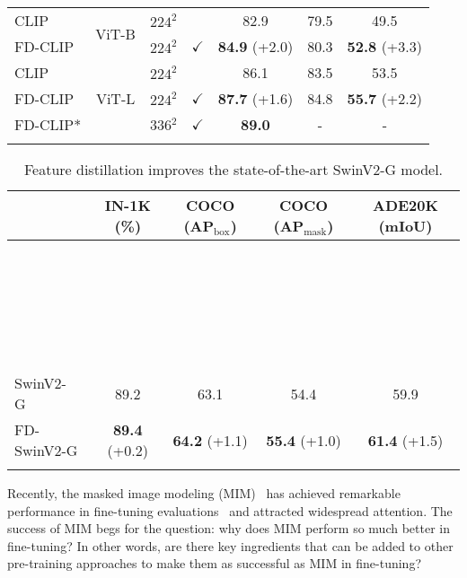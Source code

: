 \documentclass{article}
\begin{document}
\begin{table}[t]
\begin{tabular}{l|c|c|c|cc|c}
  \hline
    \hline
  CLIP~\cite{radford2021clip} & \multirow{2}{*}{ViT-B} & \multirow{1}{*}{$224^2$} &  & 82.9 & 79.5 & 49.5 \\
  FD-CLIP & & \multirow{1}{*}{$224^2$} & $\checkmark$ & \textbf{84.9}\scriptsize{ (+2.0)} & 80.3 & \textbf{52.8}\scriptsize{ (+3.3)} \\
  \hline
  CLIP~\cite{radford2021clip} & \multirow{3}{*}{ViT-L} & \multirow{1}{*}{$224^2$} & & 86.1 & 83.5 & 53.5\\
  FD-CLIP &  & $224^2$ & $\checkmark$ & \textbf{87.7}\scriptsize{ (+1.6)} & 84.8 & \textbf{55.7}\scriptsize{ (+2.2)}\\
  FD-CLIP* & & 336$^2$ & $\checkmark$ & \textbf{89.0}\scriptsize{} &  - & - \\
\Xhline{1.0pt}
  \end{tabular}
\label{tab:teaser_FD}
\end{table}


\begin{table}[t]
\caption{Feature distillation improves the state-of-the-art SwinV2-G model.}
\centering
  \begin{tabular}{l|c|c|c|c}
\Xhline{1.0pt}
  \multirow{1}{*}{Method} &  \multirow{1}{*}{IN-1K (\%)} & \multirow{1}{*}{COCO (AP$_\text{box}$)} & \multirow{1}{*}{COCO (AP$_\text{mask}$)} & \multirow{1}{*}{ADE20K (mIoU)} \\
  \hline
  \color{gray}{GLIPv2-CoSwin-H}~\cite{GLIPv2_2022} & \color{gray}{-} & \color{gray}{62.4} & \color{gray}{-} & \color{gray}{-} \\
  \color{gray}{Florence-CoSwin-H}~\cite{yuan2021florence} & \color{gray}{-} & \color{gray}{62.4} & \color{gray}{-} & \color{gray}{-}  \\
  \color{gray}{DINO-Swin-L}~\cite{zhang2022dino} & \color{gray}{-} & \color{gray}{63.3} & \color{gray}{-} & \color{gray}{-} \\
  \color{gray}{MaskDINO-Swin-L}~\cite{li2022mask} & \color{gray}{-} & \color{gray}{-} & \color{gray}{54.7} & \color{gray}{60.8} \\
  \color{gray}{ViT-Adapter-L}~\cite{chen2022vitadapter} & \color{gray}{-} & \color{gray}{-} & \color{gray}{-} & \color{gray}{60.5} \\
    \hline
  \hline
  SwinV2-G~\cite{swinv2} & 89.2 & 63.1 & 54.4 & 59.9 \\
  FD-SwinV2-G & \textbf{89.4}\scriptsize{ (+0.2)} & \textbf{64.2}\scriptsize{ (+1.1)} & \textbf{55.4}\scriptsize{ (+1.0)} & \textbf{61.4}\scriptsize{ (+1.5)} \\
\Xhline{1.0pt}
  \end{tabular}
\label{tab:FD_swinv2_G}
\end{table}
Recently, the masked image modeling (MIM)~\cite{chen2020imagegpt,bao2021beit,xie2021simmim,MaskedAutoencoders2021} has achieved remarkable performance in fine-tuning evaluations~\cite{bao2021beit,xie2021simmim,MaskedAutoencoders2021} and attracted widespread attention. The success of MIM begs for the question: why does MIM perform so much better in fine-tuning? In other words, are there key ingredients that can be added to other pre-training approaches to make them as successful as MIM in fine-tuning? 
\end{document}
